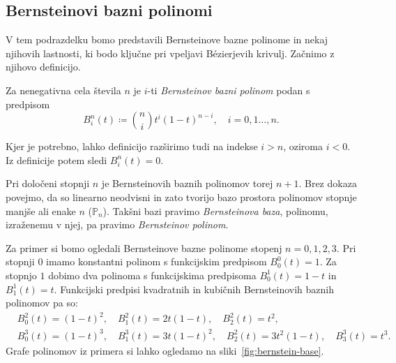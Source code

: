 \documentclass[isrm2, tisk]{fmfdelo}
\newcommand{\bernstein}[2]{\binom{#1}{#2}t^{#2}(1-t)^{#1-#2}}
\begin{document}
    \subsection{Bernsteinovi bazni polinomi}\label{subsec:bernsteinovi-polinomi}
    V tem podrazdelku bomo predstavili Bernsteinove bazne polinome in nekaj njihovih lastnosti, ki bodo ključne pri vpeljavi Bézierjevih krivulj.
    Začnimo z njihovo definicijo.
    \begin{definicija}
        \label{def:bernstein}
        Za nenegativna cela števila $n$ je $i$-ti \textit{Bernsteinov bazni polinom} podan s predpisom \[B_i^n(t)\coloneqq\bernstein{n}{i},\quad i = 0,1\ldots,n.\]
    \end{definicija}
    \begin{opomba}
        Kjer je potrebno, lahko definicijo razširimo tudi na indekse $i>n$, oziroma $i<0$.
        Iz definicije potem sledi $B_i^n(t)=0$.
    \end{opomba}
    \noindent Pri določeni stopnji $n$ je Bernsteinovih baznih polinomov torej $n+1$.
    Brez dokaza povejmo, da so linearno neodvisni in zato tvorijo bazo prostora polinomov stopnje manjše ali enake $n$ ($\mathbb{P}_n$).
    Takšni bazi pravimo \textit{Bernsteinova baza}, polinomu, izraženemu v njej, pa pravimo \textit{Bernsteinov polinom}.
    \begin{primer}
        \label{primer:bernsteinovi}
        Za primer si bomo ogledali Bernsteinove bazne polinome stopenj $n=0,1,2,3$.
        Pri stopnji $0$ imamo konstantni polinom s funkcijskim predpisom $B_{0}^{0}(t) = 1$.
        Za stopnjo $1$ dobimo dva polinoma s funkcijskima predpisoma $B_{0}^{1}(t) = 1-t$ in $B_{1}^{1}(t) = t$.
        Funkcijski predpisi kvadratnih in kubičnih Bernsteinovih baznih polinomov pa so:
        \begin{align*}
            &B_{0}^{2}(t) = (1-t)^2,\quad B_{1}^{2}(t) = 2t(1-t),\quad B_{2}^{2}(t) = t^2,  \\
            &B_{0}^{3}(t) = (1-t)^3,\quad B_{1}^{3}(t) = 3t(1-t)^2,\quad B_{2}^{2}(t) = 3t^2(1-t),\quad B_{3}^{3}(t) = t^3.
        \end{align*}
        Grafe polinomov iz primera si lahko ogledamo na sliki~\ref{fig:bernstein-base}.
    \end{primer}
\end{document}
